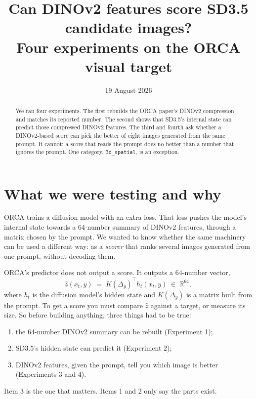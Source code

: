 \documentclass[11pt]{article}
\title{Can DINOv2 features score SD3.5 candidate images?\\
\large Four experiments on the ORCA visual target}
\author{}
\date{19 August 2026}
\begin{document}
\maketitle

\begin{abstract}
\noindent
We ran four experiments. The first rebuilds the ORCA paper's DINOv2 compression and matches its
reported number. The second shows that SD3.5's internal state can predict those compressed DINOv2
features. The third and fourth ask whether a DINOv2-based score can pick the better of eight images
generated from the same prompt. It cannot: a score that reads the prompt does no better than a
number that ignores the prompt. One category, \texttt{3d\_spatial}, is an exception.
\end{abstract}

\section{What we were testing and why}

ORCA trains a diffusion model with an extra loss. That loss pushes the model's internal state
towards a 64-number summary of DINOv2 features, through a matrix chosen by the prompt. We wanted to
know whether the same machinery can be used a different way: as a \emph{scorer} that ranks several
images generated from one prompt, without decoding them.

ORCA's predictor does not output a score. It outputs a 64-number vector,
\begin{equation}
\hat z(x_t, y) \;=\; K(\Delta_y)^\top h_t(x_t, y) \;\in\; \mathbb{R}^{64},
\end{equation}
where $h_t$ is the diffusion model's hidden state and $K(\Delta_y)$ is a matrix built from the
prompt. To get a score you must compare $\hat z$ against a target, or measure its size. So before
building anything, three things had to be true:

\begin{enumerate}
  \item the 64-number DINOv2 summary can be rebuilt (Experiment 1);
  \item SD3.5's hidden state can predict it (Experiment 2);
  \item DINOv2 features, given the prompt, tell you which image is better (Experiments 3 and 4).
\end{enumerate}

Item 3 is the one that matters. Items 1 and 2 only say the parts exist.
\end{document}
